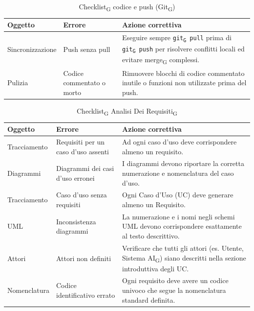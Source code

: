 \documentclass[11pt,a4paper]{article}
\newcommand{\gls}[1]{#1\textsubscript{G}}
\begin{document}
\begin{table}[H]
    \centering
    \renewcommand{\arraystretch}{1.4}
    \begin{tabular}{|l|>{\raggedright\arraybackslash}p{}|>{\raggedright\arraybackslash}p{}|}
        \hline
        \textbf{Oggetto} & \textbf{Errore} & \textbf{Azione correttiva} \\
        \hline
        Sincronizzazione & Push senza pull & Eseguire sempre \texttt{\gls{git} pull} prima di \texttt{\gls{git} push} per risolvere conflitti locali ed evitare \gls{merge} complessi. \\
        \hline
        Pulizia & Codice commentato o morto & Rimuovere blocchi di codice commentato inutile o funzioni non utilizzate prima del push. \\
        \hline
    \end{tabular}
    \caption{\gls{Checklist} codice e push (\gls{Git})}
\end{table}

\begin{table}[H]
    \centering
    \renewcommand{\arraystretch}{1.4}
    \begin{tabular}{|l|>{\raggedright\arraybackslash}p{}|>{\raggedright\arraybackslash}p{}|}
        \hline
        \textbf{Oggetto} & \textbf{Errore} & \textbf{Azione correttiva} \\
        \hline
        Tracciamento & Requisiti per un caso d'uso assenti & Ad ogni caso d'uso deve corrispondere almeno un requisito. \\
        \hline
        Diagrammi & Diagrammi dei casi d'uso erronei & I diagrammi devono riportare la corretta numerazione e nomenclatura del caso d'uso. \\
        \hline
        Tracciamento & Caso d'uso senza requisiti & Ogni Caso d'Uso (UC) deve generare almeno un Requisito. \\
        \hline
        UML & Inconsistenza diagrammi & La numerazione e i nomi negli schemi UML devono corrispondere esattamente al testo descrittivo. \\
        \hline
        Attori & Attori non definiti & Verificare che tutti gli attori (es. Utente, \gls{Sistema AI}) siano descritti nella sezione introduttiva degli UC. \\
        \hline
        Nomenclatura & Codice identificativo errato & Ogni requisito deve avere un codice univoco che segue la nomenclatura standard definita. \\
        \hline
    \end{tabular}
    \caption{\gls{Checklist} \gls{Analisi Dei Requisiti}}
\end{table}
\end{document}
